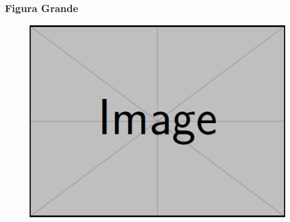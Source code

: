 \documentclass[
aspectratio=169,	%
LETI,				%
english,			%
]{DEEclassP}
\begin{document}
\begin{frame}%
\frametitle{Figura Grande}

\begin{figure}[h]						
	\centering							
	\includegraphics[width=\textwidth,height=0.8\textheight,keepaspectratio]{figures/sample.png}
\end{figure}



\end{frame}
\end{document}
